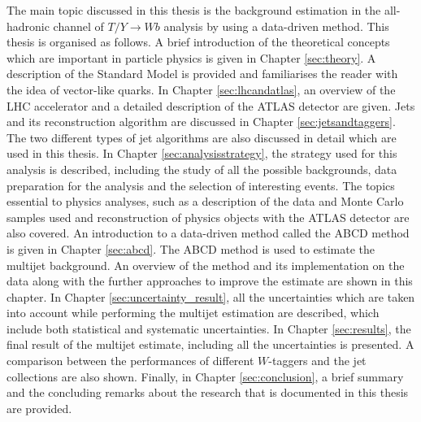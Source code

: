 The main topic discussed in this thesis is the background estimation in the all-hadronic channel of $T/Y\rightarrow Wb$ analysis by using a data-driven method. This thesis is organised as follows. A brief introduction of the theoretical concepts which are important in particle physics is given in Chapter \ref{sec:theory}. A description of the Standard Model is provided and familiarises the reader with the idea of vector-like quarks. In Chapter \ref{sec:lhcandatlas}, an overview of the LHC accelerator and a detailed description of the ATLAS detector are given. Jets and its reconstruction algorithm are discussed in Chapter \ref{sec:jetsandtaggers}. The two different types of jet algorithms are also discussed in detail which are used in this thesis. In Chapter \ref{sec:analysisstrategy}, the strategy used for this analysis is described, including the study of all the possible backgrounds, data preparation for the analysis and the selection of interesting events. The topics essential to physics analyses, such as a description of the data and Monte Carlo samples used and reconstruction of physics objects with the ATLAS detector are also covered. An introduction to a data-driven method called the ABCD method is given in Chapter \ref{sec:abcd}. The ABCD method is used to estimate the multijet background.  An overview of the method and its implementation on the data along with the further approaches to improve the estimate are shown in this chapter. In Chapter \ref{sec:uncertainty_result}, all the uncertainties which are taken into account while performing the multijet estimation are described, which include both statistical and systematic uncertainties. In Chapter \ref{sec:results}, the final result of the multijet estimate, including all the uncertainties is presented. A comparison between the performances of different $W$-taggers and the jet collections are also shown. Finally, in Chapter \ref{sec:conclusion}, a brief summary and the concluding remarks about the research that is documented in this thesis are provided.


